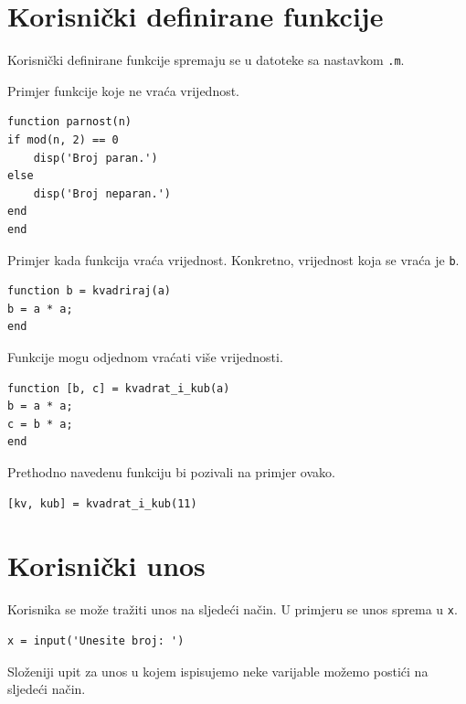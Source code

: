 \documentclass[a4paper, 10pt]{article}
\begin{document}

\section{Korisnički definirane funkcije}

Korisnički definirane funkcije spremaju se u datoteke sa nastavkom \texttt{.m}.

Primjer funkcije koje ne vraća vrijednost.

\begin{lstlisting}
function parnost(n)
if mod(n, 2) == 0
    disp('Broj paran.')
else
    disp('Broj neparan.')
end
end
\end{lstlisting}

Primjer kada funkcija vraća vrijednost.
Konkretno, vrijednost koja se vraća je \texttt{b}.

\begin{lstlisting}
function b = kvadriraj(a)
b = a * a;
end
\end{lstlisting}

Funkcije mogu odjednom vraćati više vrijednosti.

\begin{lstlisting}
function [b, c] = kvadrat_i_kub(a)
b = a * a;
c = b * a;
end
\end{lstlisting}

Prethodno navedenu funkciju bi pozivali na primjer ovako.

\begin{lstlisting}
[kv, kub] = kvadrat_i_kub(11)
\end{lstlisting}


\section{Korisnički unos}

Korisnika se može tražiti unos na sljedeći način.
U primjeru se unos sprema u \texttt{x}.

\begin{lstlisting}
x = input('Unesite broj: ')
\end{lstlisting}

Složeniji upit za unos u kojem ispisujemo neke varijable možemo postići na sljedeći način.
\end{document}
